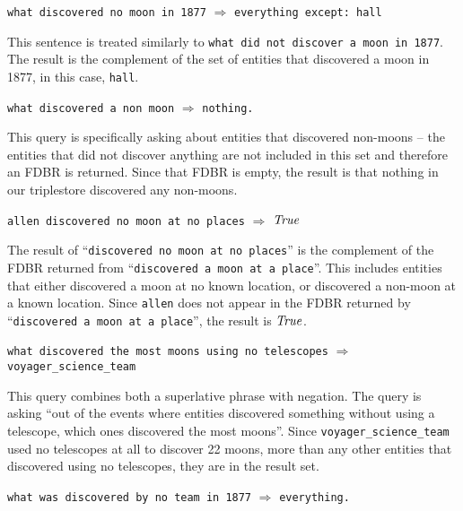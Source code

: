 \documentclass[../main.tex]{subfiles}
\begin{document}
\begin{refsection}
\examplespacing

\texttt{what discovered no moon in 1877} $\Rightarrow$ \texttt{everything except: hall}

\examplespacing

\noindent This sentence is treated similarly to \texttt{what did not discover a moon in 1877}.  The result is the complement of the set of entities that discovered a moon in 1877, in this case, \texttt{hall}.

\examplespacing

\texttt{what discovered a non moon} $\Rightarrow$ \texttt{nothing.}

\examplespacing

\noindent This query is specifically asking about entities that discovered non-moons -- the entities that did not discover anything are not included in this set and therefore an FDBR is returned.  Since that FDBR is empty, the result is that nothing in our triplestore discovered any non-moons.

\examplespacing

\texttt{allen discovered no moon at no places} $\Rightarrow$ $\mathit{True}$

\examplespacing

\noindent The result of ``\texttt{discovered no moon at no places}'' is the complement of the FDBR returned from ``\texttt{discovered a moon at a place}''.  This includes entities that either discovered a moon at no known location, or discovered a non-moon at a known location.  Since \texttt{allen} does not appear in the FDBR returned by ``\texttt{discovered a moon at a place}'', the result is $\mathit{True}$.

\examplespacing

\texttt{what discovered the most moons using no telescopes} \linebreak \indent \indent $\Rightarrow$ \texttt{voyager\_science\_team}

\examplespacing

\noindent This query combines both a superlative phrase with negation.  The query is asking ``out of the events where entities discovered something without using a telescope, which ones discovered the most moons''.  Since \texttt{voyager\_science\_team} used no telescopes at all to discover 22 moons, more than any other entities that discovered using no telescopes, they are in the result set.

\examplespacing

\texttt{what was discovered by no team in 1877} $\Rightarrow$ \texttt{everything.}


\end{refsection}
\end{document}

